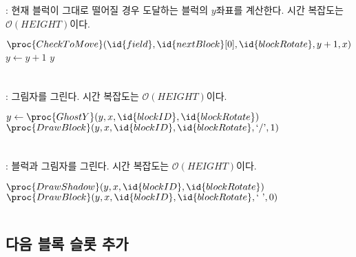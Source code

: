 \subsubsection{}: 현재 블럭이 그대로 떨어질 경우 도달하는 블럭의 $y$좌표를 계산한다. 시간 복잡도는 $\mathcal{O}\left(HEIGHT\right)$이다.
\begin{codebox}
\li \While $\proc{CheckToMove}(\id{field}, \id{nextBlock}[0], \id{blockRotate}, y + 1, x)$
\li \Do
        $y \gets y + 1$
    \End
\li \Return $y$
\end{codebox}

\inputminted[xleftmargin=\parindent,linenos,firstline=292,lastline=295]{c}{inc-sources/tetris-week09-homework.c}

\subsubsection{}: 그림자를 그린다. 시간 복잡도는 $\mathcal{O}\left(HEIGHT\right)$이다.

\begin{codebox}
\li $y \gets \proc{GhostY}(y, x, \id{blockID}, \id{blockRotate})$
\li $\proc{DrawBlock}(y, x, \id{blockID}, \id{blockRotate}, \mbox{`/'}, 1)$
\end{codebox}

\inputminted[xleftmargin=\parindent,linenos,firstline=378,lastline=381]{c}{inc-sources/tetris-week09-homework.c}

\subsubsection{}: 블럭과 그림자를 그린다. 시간 복잡도는 $\mathcal{O}\left(HEIGHT\right)$이다.

\begin{codebox}
\li $\proc{DrawShadow}(y, x, \id{blockID}, \id{blockRotate})$
\li $\proc{DrawBlock}(y, x, \id{blockID}, \id{blockRotate}, \mbox{` '}, 0)$
\end{codebox}

\inputminted[xleftmargin=\parindent,linenos,firstline=383,lastline=386]{c}{inc-sources/tetris-week09-homework.c}

\subsection{다음 블록 슬롯 추가}

